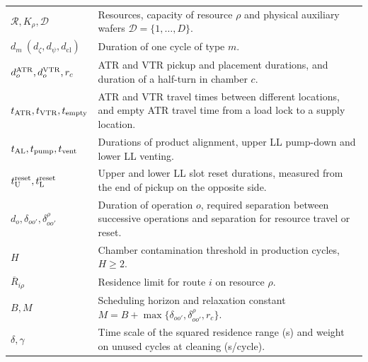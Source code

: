 \begin{table}[!t]
\begin{tabular}{@{}C{0.20\textwidth}C{\textwidth-8pt\relax}@{}}
$\mathcal R,K_\rho,\mathcal D$ & Resources, capacity of resource $\rho$ and physical auxiliary wafers $\mathcal D=\{1,\ldots,D\}$.\\
$d_m\ (d_\zeta,d_\psi,d_{\mathrm{cl}})$ & Duration of one cycle of type $m$.\\
$d_o^{\rm ATR},d_o^{\rm VTR},r_c$ & ATR and VTR pickup and placement durations, and duration of a half-turn in chamber $c$.\\
$t_{\rm ATR},t_{\rm VTR},t_{\rm empty}$ & ATR and VTR travel times between different locations, and empty ATR travel time from a load lock to a supply location.\\
$t_{\rm AL},t_{\rm pump},t_{\rm vent}$ & Durations of product alignment, upper LL pump-down and lower LL venting.\\
$t_{\rm U}^{\rm reset},t_{\rm L}^{\rm reset}$ & Upper and lower LL slot reset durations, measured from the end of pickup on the opposite side.\\
$d_o,\delta_{oo'},\delta^\rho_{oo'}$ & Duration of operation $o$, required separation between successive operations and separation for resource travel or reset.\\
$H$ & Chamber contamination threshold in production cycles, $H\ge2$.\\
$\overline R_{i\rho}$ & Residence limit for route $i$ on resource $\rho$.\\
$B,M$ & Scheduling horizon and relaxation constant $M=B+\max\{\delta_{oo'},\delta^\rho_{oo'},r_c\}$.\\
$\delta,\gamma$ & Time scale of the squared residence range (s) and weight on unused cycles at cleaning (s/cycle).\\
\bottomrule
\end{tabular}
\end{table}

